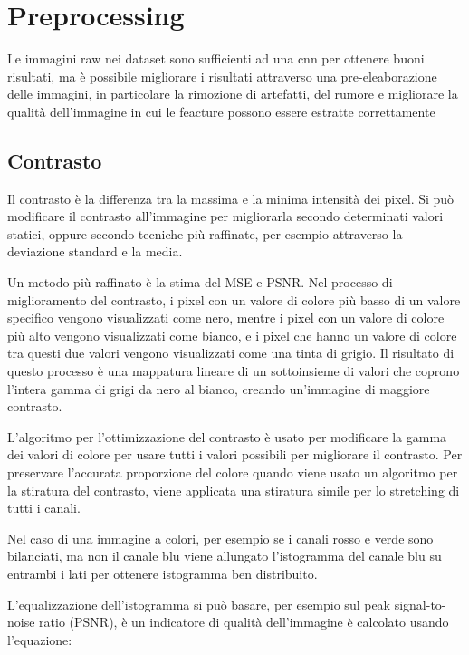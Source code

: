 \chapter{Preprocessing}\label{preprocessing}

Le immagini raw nei dataset sono sufficienti ad una \gls{cnn} per ottenere buoni risultati, ma è possibile migliorare i risultati attraverso una pre-eleaborazione delle immagini, in particolare la rimozione di artefatti,  del rumore e migliorare la qualità dell'immagine 
in cui le feacture  possono essere estratte correttamente\cite{permual_contrast}

\section{Contrasto}\label{contrasto}

Il contrasto è la differenza tra la massima e la minima
intensità dei pixel. Si può modificare il contrasto all'immagine per migliorarla secondo determinati valori statici, oppure secondo tecniche più raffinate, per esempio attraverso la deviazione standard e la media. 

Un metodo più raffinato è la stima del MSE e PSNR. Nel processo di miglioramento del contrasto, i pixel con
un valore di colore più basso di un valore specifico vengono visualizzati come
nero, mentre i pixel con un valore di colore più alto vengono
visualizzati come bianco, e i pixel che hanno un valore di colore tra questi due valori vengono visualizzati come una tinta di grigio.
Il risultato di questo processo è una mappatura lineare di un
sottoinsieme di valori che coprono l'intera gamma di grigi da
nero al bianco, creando un'immagine di maggiore contrasto. 

L'algoritmo per l'ottimizzazione del contrasto è usato per modificare
la gamma dei valori di colore per usare tutti i valori possibili per
migliorare il contrasto. Per preservare l'accurata proporzione del colore
quando viene usato un algoritmo per la  stiratura del contrasto,
viene applicata una stiratura simile per lo stretching di tutti i canali. 

Nel caso di una immagine a colori, per esempio se i canali rosso e verde sono bilanciati, ma non il canale blu viene allungato l'istogramma del canale blu su entrambi i lati per ottenere
istogramma ben distribuito.

L'equalizzazione dell'istogramma si può basare, per esempio sul peak signal-to-noise ratio (PSNR), è un indicatore di qualità dell'immagine è calcolato usando l'equazione:


